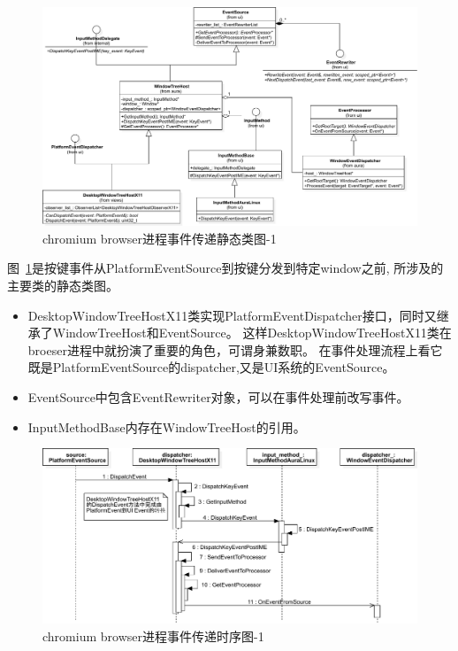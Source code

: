 \documentclass[12pt]{article}
\begin{document}

\begin{figure}[H] 
  \centering 
  \includegraphics[width=\textwidth]{image/browser_event_dispatch_class_1.pdf} 
  \caption{chromium browser进程事件传递静态类图-1} \label{fig:linux_event_dispatch_class_1} 
\end{figure}

图~\ref{fig:linux_event_dispatch_class_1}是按键事件从PlatformEventSource到按键分发到特定window之前,
所涉及的主要类的静态类图。
\begin{itemize}
  \item DesktopWindowTreeHostX11类实现PlatformEventDispatcher接口，同时又继承了WindowTreeHost和EventSource。
  这样DesktopWindowTreeHostX11类在broeser进程中就扮演了重要的角色，可谓身兼数职。
  在事件处理流程上看它既是PlatformEventSource的dispatcher,又是UI系统的EventSource。
  \item EventSource中包含EventRewriter对象，可以在事件处理前改写事件。
  \item InputMethodBase内存在WindowTreeHost的引用。
\end{itemize}

\begin{figure}[H] 
  \centering 
  \includegraphics[width=\textwidth]{image/browser_event_dispatch_sequence_1.pdf} 
  \caption{chromium browser进程事件传递时序图-1} \label{fig:browser_event_dispatch_sequence_1} 
\end{figure}
\end{document}
